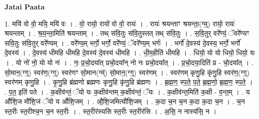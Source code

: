 \documentclass[17pt]{extarticle}
\begin{document}
\textbf{Jatai Paata} \newline

1. मयि॑ वो वो॒ मयि॒ मयि॑ वः । . वो॒ रायो॒ रायो॑ वो वो॒ रायः॑ । . रायः॑ श्रयन्ताꣳ श्रयन्ता॒(ग्म्॒) रायो॒ रायः॑ श्रयन्ताम् । . श्र॒य॒न्ता॒मिति॑ श्रयन्ताम् । . तथ् स॑वि॒तुः स॑वि॒तुस्तत् तथ् स॑वि॒तुः । . स॒वि॒तुर् वरे᳚ण्यं॒ ॅवरे᳚ण्यꣳ सवि॒तुः स॑वि॒तुर् वरे᳚ण्यम् । . वरे᳚ण्य॒म् भर्गो॒ भर्गो॒ वरे᳚ण्यं॒ ॅवरे᳚ण्य॒म् भर्गः॑ । . भर्गो॑ दे॒वस्य॑ दे॒वस्य॒ भर्गो॒ भर्गो॑ दे॒वस्य॑ । . दे॒वस्य॑ धीमहि धीमहि दे॒वस्य॑ दे॒वस्य॑ धीमहि । . धी॒म॒हीति॑ धीमहि । . धियो॒ यो यो धियो॒ धियो॒ यः । . यो नो॑ नो॒ यो यो नः॑ । . नः॒ प्र॒चो॒दया᳚त् प्रचो॒दया᳚न् नो नः प्रचो॒दया᳚त् । . प्र॒चो॒दया॒दिति॑ प्र - चो॒दया᳚त् । . सो॒मान॒(ग्ग्॒) स्वर॑ण॒(ग्ग्॒) स्वर॑णꣳ सो॒मान(ग्म्॑) सो॒मान॒(ग्ग्॒) स्वर॑णम् । . स्वर॑णम् कृणु॒हि कृ॑णु॒हि स्वर॑ण॒(ग्ग्॒) स्वर॑णम् कृणु॒हि । . कृ॒णु॒हि ब्र॑ह्मणो ब्रह्मणः कृणु॒हि कृ॑णु॒हि ब्र॑ह्मणः । . ब्र॒ह्म॒ण॒ स्प॒ते॒ प॒ते॒ ब्र॒ह्म॒णो॒ ब्र॒ह्म॒ण॒ स्प॒ते॒ । . प॒त॒ इति॑ पते । . क॒क्षीव॑न्तं॒ ॅयो यः क॒क्षीव॑न्तम् क॒क्षीव॑न्तं॒ ॅयः । . क॒क्षीव॑न्त॒मिति॑ क॒क्षी - व॒न्त॒म् । . य औ॑शि॒ज मौ॑शि॒जं ॅयो य औ॑शि॒जम् । . औ॒शि॒जमित्यौ॑शि॒जम् । . क॒दा च॒न च॒न क॒दा क॒दा च॒न । . च॒न स्त॒रीः स्त॒रीश्च॒न च॒न स्त॒रीः । . स्त॒रीर॑स्यसि स्त॒रीः स्त॒रीर॑सि । . अ॒सि॒ न नास्य॑सि॒ न । \newline
\end{document}
